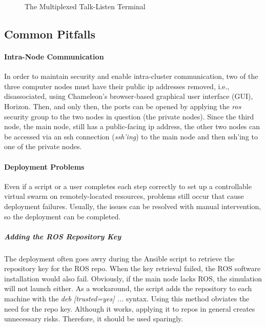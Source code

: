\documentclass[9pt,twocolumn,twoside]{../../styles/osajnl}
\begin{document}
\begin{figure}[htbp]
\centering
{}
\caption{The Multiplexed Talk-Listen Terminal}
\label{fig:byobu}
\end{figure}

\subsection{Common Pitfalls}
\paragraph{Intra-Node Communication}
In order to maintain security and enable intra-cluster communication, two of the three computer nodes must have their public ip addresses removed, i.e., disassociated, using Chameleon's browser-based graphical user interface (GUI), Horizon.  Then, and only then, the ports can be opened by applying the \textit{ros} security group to the two nodes in question (the private nodes).  Since the third node, the main node, still has a public-facing ip address, the other two nodes can be accessed via an ssh connection (\textit{ssh'ing}) to the main node and then ssh'ing to one of the private nodes.

\paragraph{Deployment Problems}
Even if a script or a user completes each step correctly to set up a controllable virtual swarm on remotely-located resources, problems still occur that cause deployment failures.  Usually, the issues can be resolved with manual intervention, so the deployment can be completed.  

\subparagraph{Adding the ROS Repository Key}
The deployment often goes awry during the Ansible script to retrieve the repository key for the ROS repo.  When the key retrieval failed, the ROS software installation would also fail.  Obviously, if the main node lacks ROS, the simulation will not launch either.  As a workaround, the script adds the repository to each machine with the \textit{deb [trusted=yes] ...} syntax.  Using this method obviates the need for the repo key.  Although it works, applying it to repos in general creates unnecessary risks.  Therefore, it should be used sparingly.  
\end{document}
